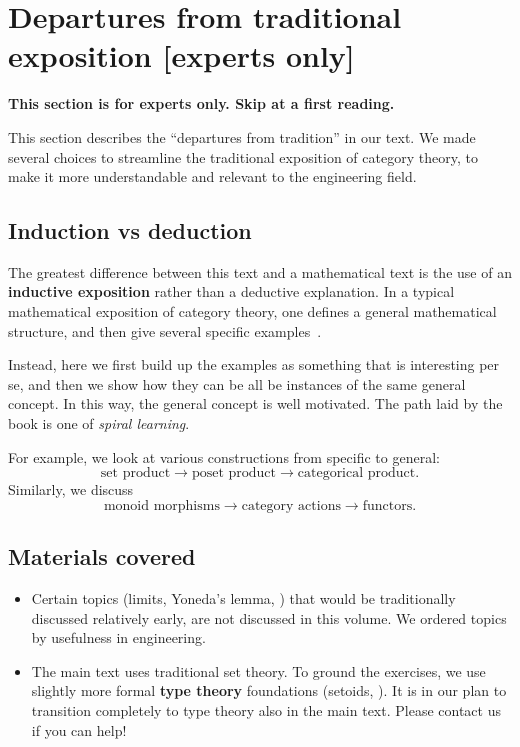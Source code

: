 
\section[Departures from tradition]{Departures from traditional exposition [experts only]}

\textbf{This section is for experts only.
    Skip at a first reading.
}

This section describes the ``departures from tradition'' in our text.
We made several choices to streamline the traditional exposition of category theory, to make it more understandable and relevant to the engineering field.

\subsection{Induction vs deduction}

The greatest difference between this text and a mathematical text is the use of an \textbf{inductive exposition} rather than a deductive explanation.
In a typical mathematical exposition of category theory, one defines a general mathematical structure, and then give several specific examples~\cite{riehl2017category}.

Instead, here we first build up the examples as something that is interesting per se, and then we show how they can be all be instances of the same general concept.
In this way, the general concept is well motivated.
The path laid by the book is one of \emph{spiral learning}.

For example, we look at various constructions from specific to general:
%
\begin{equation}
    \text{set product}  \rightarrow \text{poset product} \rightarrow \text{categorical product}.
\end{equation}
%
Similarly, we discuss
%
\begin{equation}
    \text{monoid morphisms}  \rightarrow \text{category actions} \rightarrow \text{functors}.
\end{equation}

\subsection{Materials covered}
\begin{itemize}
    \item Certain topics (limits, Yoneda's lemma, \etc) that would be traditionally discussed relatively early, are not discussed in this volume.
          We ordered topics by usefulness in engineering.

    \item The main text uses traditional set theory.
          To ground the exercises, we use slightly more formal \textbf{type theory} foundations (setoids, \etc).
          It is in our plan to transition completely to type theory also in the main text.
          Please contact us if you can help!

\end{itemize}

